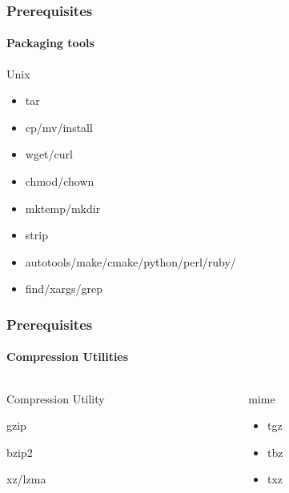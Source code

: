 \documentclass[12pt,hyperref={pdfpagelabels=true}]{beamer}
\begin{document}
\begin{frame}
  \frametitle{Prerequisites}
  \framesubtitle{Packaging tools}
  \begin{block}{Unix}
    \begin{itemize}[<+-| alert@+>]
    \item tar
    \item cp/mv/install
    \item wget/curl
    \item chmod/chown
    \item mktemp/mkdir
    \item strip
    \item autotools/make/cmake/python/perl/ruby/
    \item find/xargs/grep
    \end{itemize}
  \end{block}
\end{frame}

\begin{frame}
  \frametitle{Prerequisites}
  \framesubtitle{Compression Utilities}
  \begin{columns}
    \begin{column}{4cm}
      \begin{block}{Compression Utility}
        \begin{description}
        \item<1-> gzip
        \item<2-> bzip2
        \item<3-> xz/lzma
        \end{description}
      \end{block}
    \end{column}

    \begin{column}{4cm}
      \begin{block}{mime}
        \begin{itemize}
        \item<1-> tgz
        \item<2-> tbz
        \item<3-> txz
        \end{itemize}
      \end{block}
    \end{column}
  \end{columns}
\end{frame}
\end{document}
